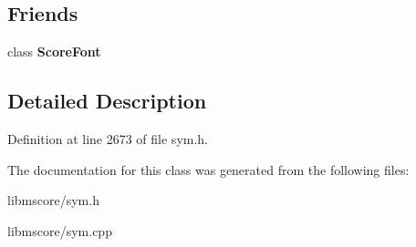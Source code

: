 \subsection*{Friends}
\begin{DoxyCompactItemize}
\item 
\mbox{\label{class_ms_1_1_sym_a8314df6d28308a54e8863dc21ff395a4}} 
class {\bfseries Score\+Font}
\end{DoxyCompactItemize}


\subsection{Detailed Description}


Definition at line 2673 of file sym.\+h.



The documentation for this class was generated from the following files\+:\begin{DoxyCompactItemize}
\item 
libmscore/sym.\+h\item 
libmscore/sym.\+cpp\end{DoxyCompactItemize}
